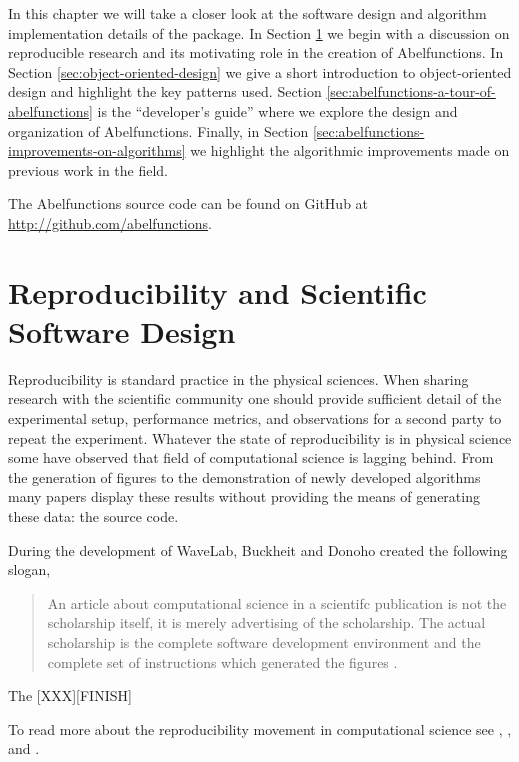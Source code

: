 In this chapter we will take a closer look at the software design and algorithm
implementation details of the package. In Section \ref{sec:reproducibility} we
begin with a discussion on reproducible research and its motivating role in the
creation of Abelfunctions. In Section \ref{sec:object-oriented-design} we give a
short introduction to object-oriented design and highlight the key patterns
used. Section \ref{sec:abelfunctions-a-tour-of-abelfunctions} is the
``developer's guide'' where we explore the design and organization of
Abelfunctions. Finally, in Section
\ref{sec:abelfunctions-improvements-on-algorithms} we highlight the algorithmic
improvements made on previous work in the field.

The Abelfunctions source code can be found on GitHub at
\url{http://github.com/abelfunctions}.


\section{Reproducibility and Scientific Software Design}\label{sec:reproducibility}

Reproducibility is standard practice in the physical sciences. When sharing
research with the scientific community one should provide sufficient detail of
the experimental setup, performance metrics, and observations for a second party
to repeat the experiment. Whatever the state of reproducibility is in physical
science some have observed that field of computational science is lagging
behind. From the generation of figures to the demonstration of newly developed
algorithms many papers display these results without providing the means of
generating these data: the source code.

During the development of WaveLab, Buckheit and Donoho created the following
slogan,
\begin{quotation}
  An article about computational science in a scientifc publication is not the
  scholarship itself, it is merely advertising of the scholarship. The actual
  scholarship is the complete software development environment and the complete
  set of instructions which generated the figures \cite{buckheit1995wavelab}.
\end{quotation}
The [XXX][FINISH]

To read more about the reproducibility movement in computational science see
\cite{peng2011reproducible}, \cite{stodden2012reproducible}, and
\cite{stodden2013best}.


